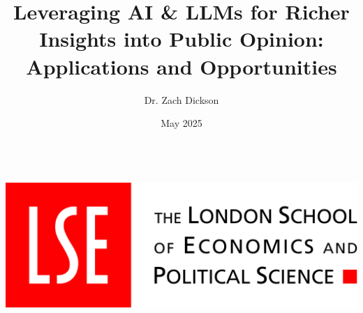 \documentclass[10pt,aspectratio=169]{beamer}
\title[LLMs in Public Opinion Research]{Leveraging AI \& LLMs for Richer Insights into Public Opinion: Applications and Opportunities}
\author{Dr. Zach Dickson} %
\institute[LSE] %
{\noindent
  \texttt{\color{purple}z.dickson@lse.ac.uk}\\%
  \href{https://z-dickson.github.io/}{\color{blue}https://z-dickson.github.io/}\\
  Research Fellow in Quantitative Methods\\
  Affiliate at the LSE Data Science Institute
  
}
\date{May 2025} %
\begin{document}
{
  \begin{frame}
    \titlepage
    \vspace{-0.8cm}
    \hbox{
    \includegraphics[scale=0.03,keepaspectratio]{figures/London_school_of_economics_logo_with_name.jpg}
    }
  \end{frame}
}

\AtBeginSection[]











\end{document}

